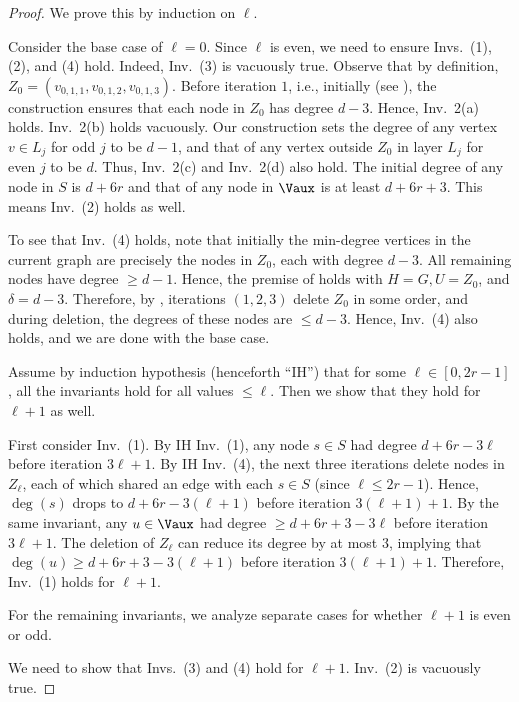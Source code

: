 \begin{proof}
  We prove this by induction on $\ell$. 
  
   Consider the base case of $\ell=0$. Since $\ell$ is even, we need to ensure Invs.~(1), (2), and (4) hold. Indeed, Inv.~(3) is vacuously true. Observe that by definition, $Z_0=(v_{0,1,1}, v_{0,1,2},v_{0,1,3})$. Before iteration $1$, i.e., initially (see ), the construction ensures that each node in $Z_0$ has degree $d-3$. Hence, Inv.~2(a) holds. Inv.~2(b) holds vacuously. Our construction sets the degree of any vertex $v\in L_j$ for odd $j$ to be $d-1$, and that of any vertex outside $Z_0$ in layer $L_j$ for even $j$ to be $d$. Thus, Inv.~2(c) and Inv.~2(d) also hold. The initial degree of any node in $S$ is $d+6r$ and that of any node in $\Vaux$ is at least $d+6r+3$. This means Inv.~(2) holds as well.

  To see that Inv.~(4) holds, note that initially the min-degree vertices in the current graph are precisely the nodes in $Z_{0}$, each with degree $d-3$. All remaining nodes have degree $\geq d-1$. Hence, the premise of  holds with $H=G, U=Z_0$, and $\delta=d-3$. Therefore, by , iterations $(1,2,3)$ delete $Z_0$ in some order, and during deletion, the degrees of these nodes are $\leq d-3$. Hence, Inv.~(4) also holds, and we are done with the base case.    

 
 Assume by induction hypothesis (henceforth ``IH'') that for some $\ell\in [0,2r-1]$, all the invariants hold for all values $\leq \ell$. Then we show that they hold for $\ell+1$ as well. 

First consider Inv.~(1). By IH Inv.~(1), any node $s\in S$ had degree $d+6r-3\ell$ before iteration $3\ell+1$. By IH Inv.~(4), the next three iterations delete nodes in $Z_\ell$, each of which shared an edge with each $s\in S$ (since $\ell\leq 2r-1$). Hence, $\deg(s)$ drops to $d+6r-3(\ell+1)$ before iteration $3(\ell+1)+1$. By the same invariant, any $u\in \Vaux$ had degree $\geq d+6r+3-3\ell$ before iteration $3\ell+1$. The deletion of $Z_\ell$ can reduce its degree by at most $3$, implying that $\deg(u)\geq d+6r+3-3(\ell+1)$ before iteration $3(\ell+1)+1$. Therefore, Inv.~(1) holds for $\ell+1$. 

For the remaining invariants, we analyze separate cases for whether $\ell+1$ is even or odd.  

 We need to show that Invs.~(3) and (4) hold for $\ell+1$. Inv.~(2) is vacuously true. 


\end{proof}

